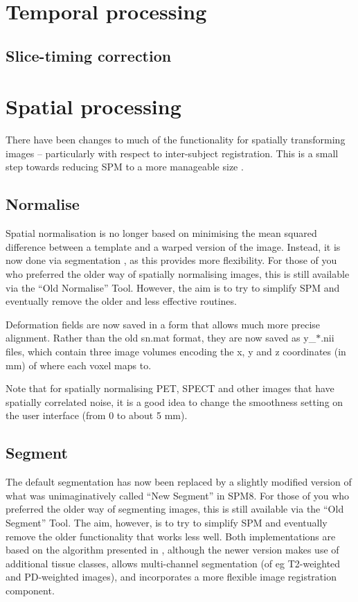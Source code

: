 \documentclass[a4paper,titlepage,openany]{article}
\begin{document}

\vspace{10mm}
\begin{multicols}{2}

\section{Temporal processing}

\subsection{Slice-timing correction}

\section{Spatial processing}
There have been changes to much of the functionality for spatially transforming images -- particularly with respect to inter-subject registration.
This is a small step towards reducing SPM to a more manageable size \cite{ashburner2011spm}.

\subsection{Normalise}
Spatial normalisation is no longer based on minimising the mean squared difference between a template and a warped version of the image.
Instead, it is now done via segmentation \cite{ashburner05}, as this provides more flexibility.
For those of you who preferred the older way of spatially normalising images, this is still available via the ``Old Normalise'' Tool.
However, the aim is to try to simplify SPM and eventually remove the older and less effective \cite{klein_evaluation} routines.

Deformation fields are now saved in a form that allows much more precise alignment.
Rather than the old sn.mat format, they are now saved as y\_$*$.nii files, which contain three image volumes encoding the x, y and z coordinates (in mm) of where each voxel maps to.

Note that for spatially normalising PET, SPECT and other images that have spatially correlated noise, it is a good idea to change the smoothness setting on the user interface (from 0 to about 5 mm).

\subsection{Segment}
The default segmentation has now been replaced by a slightly modified version of what was unimaginatively called ``New Segment'' in SPM8.
For those of you who preferred the older way of segmenting images, this is still available via the ``Old Segment'' Tool.
The aim, however, is to try to simplify SPM and eventually remove the older functionality that works less well.
Both implementations are based on the algorithm presented in \cite{ashburner05}, although the newer version makes use of additional tissue classes, allows multi-channel segmentation (of eg T2-weighted and PD-weighted images), and incorporates a more flexible image registration component.


\end{multicols}
\end{document}

